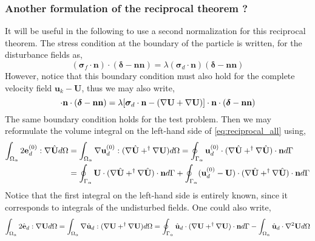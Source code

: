 \subsubsection{Another formulation of the reciprocal theorem ? }
It will be useful in the following to use a second normalization for this reciprocal theorem. 
The stress condition at the boundary of the particle is written, for the disturbance fields as, 
\begin{equation*}
    (\bm\sigma_f\cdot\textbf{n})\cdot (\bm\delta - \textbf{nn})
    = \lambda (\bm\sigma_d\cdot \textbf{n})(\bm\delta - \textbf{nn})
\end{equation*}
However, notice that this boundary condition must also hold for the complete velocity field $\textbf{u}_k - \textbf{U}$, thus we may also write, 
\begin{equation*}
    [\bm\sigma_f
    - (\grad \textbf{U}+\grad \textbf{U})
    ]\cdot \textbf{n}\cdot  (\bm\delta - \textbf{nn})
    = 
    \lambda [\bm\sigma_d\cdot \textbf{n}
    - (\grad \textbf{U}+\grad \textbf{U})
    ]\cdot \textbf{n}\cdot (\bm\delta - \textbf{nn})
\end{equation*}
The same boundary condition holds for the test problem. 
Then we may reformulate the volume integral on the left-hand side of \ref{eq:reciprocal_all} using, 
\begin{align*}
    \int_{\Omega_{\alpha}}  2\textbf{e}_d^{(0)} : \mathbf{\nabla} \hat{\textbf{U}}  d\Omega
    &=\int_{\Omega_{\alpha}}  \mathbf{\nabla} \textbf{u}_d^{(0)} : (\mathbf{\nabla} \hat{\textbf{U}} +^\dagger \mathbf{\nabla} \textbf{U})  d\Omega
    =
    \oint_{\Gamma_{\alpha}}   \textbf{u}_d^{(0)} \cdot (\mathbf{\nabla} \hat{\textbf{U}} + ^\dagger\mathbf{\nabla} \hat{\textbf{U}})  \cdot \textbf{n} d\Gamma\\
    &=
    \oint_{\Gamma_{\alpha}}   \textbf{U} \cdot (\mathbf{\nabla} \hat{\textbf{U}} + ^\dagger\mathbf{\nabla} \hat{\textbf{U}})  \cdot \textbf{n} d\Gamma
    + \oint_{\Gamma_{\alpha}}   (\textbf{u}_d^{(0)} - \textbf{U})\cdot (\mathbf{\nabla} \hat{\textbf{U}} + ^\dagger\mathbf{\nabla} \hat{\textbf{U}})  \cdot \textbf{n} d\Gamma
    \\
\end{align*}
Notice that the first integral on the left-hand side is entirely known, since it corresponds to integrals of the undisturbed fields.
One could also write, 
\begin{align*}
    \int_{\Omega_{\alpha}}  2\hat{\textbf{e}}_d : \mathbf{\nabla} {\textbf{U}}  d\Omega
    =\int_{\Omega_{\alpha}}  \mathbf{\nabla} \hat{\textbf{u}}_d : (\mathbf{\nabla} {\textbf{U}} +^\dagger \mathbf{\nabla} \textbf{U})  d\Omega
    =
    \oint_{\Gamma_{\alpha}}   \hat{\textbf{u}}_d \cdot (\mathbf{\nabla} {\textbf{U}} + ^\dagger\mathbf{\nabla} {\textbf{U}})  \cdot \textbf{n} d\Gamma
    -\int_{\Omega_{\alpha}} \hat{\textbf{u}}_d \cdot \mathbf{\nabla}^2 {\textbf{U}}  d\Omega
    \\
\end{align*}
